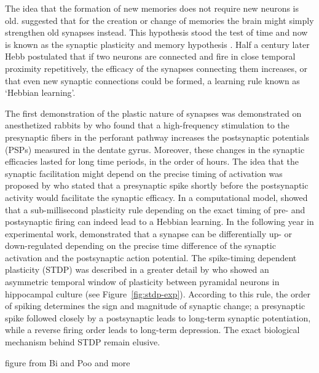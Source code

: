     The idea that the formation of new memories does not require new neurons is
    old. \cite{Cajal1894} suggested that for the creation or change of memories
    the brain might simply strengthen old synapses instead. This hypothesis stood
    the test of time and now is known as the synaptic plasticity and memory
    hypothesis \citep{Martin2000, Takeuchi2014}. Half a century later Hebb
    postulated that if two neurons are connected and fire in close temporal
    proximity repetitively, the efficacy of the synapses connecting them
    increases, or that even new synaptic connections could be formed, a learning
    rule known as `Hebbian learning'.

    The first demonstration of the plastic nature of synapses was demonstrated on
    anesthetized rabbits by \cite{Lomo1966} who found that a high-frequency
    stimulation to the presynaptic fibers in the perforant pathway increases the
    postsynaptic potentials (PSPs) measured in the dentate gyrus. Moreover, these
    changes in the synaptic efficacies lasted for long time periods, in the order of
    hours. The idea that the synaptic facilitation might depend on the precise
    timing of activation was proposed by \cite{Taylor1973} who stated that a
    presynaptic spike shortly before the postsynaptic activity would facilitate
    the synaptic efficacy. In a computational model, \cite{Gerstner1996} showed
    that a sub-millisecond plasticity rule depending on the exact timing of pre-
    and postsynaptic firing can indeed lead to a Hebbian learning. In the
    following year in experimental work, \cite{Markram1997} demonstrated that a
    synapse can be differentially up- or down-regulated depending on the precise
    time difference of the synaptic activation and the postsynaptic action
    potential. The spike-timing dependent plasticity (STDP) was described in a
    greater detail by \cite{Bi1998} who showed an asymmetric temporal window of
    plasticity between pyramidal neurons in hippocampal culture (see
    Figure~\ref{fig:stdp-exp}). According to this rule, the order of spiking
    determines the sign and magnitude of synaptic change; a presynaptic spike
    followed closely by a postsynaptic leads to long-term synaptic potentiation,
    while a reverse firing order leads to long-term depression. The exact
    biological mechanism behind STDP remain elusive.

    figure from Bi and Poo and more

